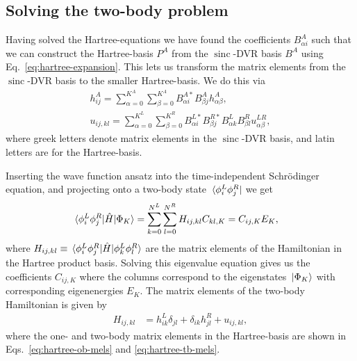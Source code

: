 \documentclass[twocolumn,superscriptaddress,unsortedaddress,
 amsmath,amssymb,
 aps,
]{revtex4-2}
\DeclareMathOperator{\sinc}{sinc}
\begin{document}
    \subsection{Solving the two-body problem}
        Having solved the Hartree-equations we have found
        the coefficients $B^A_{\alpha i}$ such that we can
        construct the Hartree-basis $P^A$ from the
        $\sinc$-DVR basis $B^A$ using
        Eq.~\eqref{eq:hartree-expansion}.
        This lets us transform the matrix elements from the
        $\sinc$-DVR basis to the smaller Hartree-basis.
        We do this via
        \begin{gather}
            h^A_{ij}
            = \sum_{\alpha = 0}^{K^A} \sum_{\beta = 0}^{K^A}
            B^{A*}_{\alpha i} B^A_{\beta j} h^A_{\alpha \beta},
            \label{eq:hartree-ob-mels}
            \\
            u_{ij, kl}
            = \sum_{\alpha = 0}^{K^L} \sum_{\beta = 0}^{K^R}
            B^{L*}_{\alpha i}
            B^{R*}_{\beta j}
            B^{L}_{\alpha k}
            B^{R}_{\beta l}
            u^{LR}_{\alpha \beta},
            \label{eq:hartree-tb-mels}
        \end{gather}
        where greek letters denote matrix elements in the
        $\sinc$-DVR basis, and latin letters are for the
        Hartree-basis.

        Inserting the wave function ansatz into the time-independent Schrödinger
        equation, and projecting onto a two-body state
        $\bra*{\phi^L_i \phi^R_j}$ we get
        \begin{align*}
            \mel*{\phi^L_i \phi^R_j}{\hat{H}}{\Phi_K}
            &= %
            \sum_{k = 0}^{N^L} \sum_{l = 0}^{N^R}
            H_{ij, kl} C_{kl, K}
            = C_{ij, K} E_{K},
        \end{align*}
        where $H_{ij, kl} \equiv \mel*{\phi^L_i \phi^R_j}{\hat{H}}{
        \phi^L_k \phi^R_l}$ are the matrix elements of the Hamiltonian in
        the Hartree product basis.
        Solving this eigenvalue equation gives us the
        coefficients $C_{ij, K}$ where the columns correspond to the
        eigenstates $\ket*{\Phi_K}$ with corresponding eigenenergies $E_K$.
        The matrix elements of the two-body Hamiltonian is given by
        \begin{align*}
            H_{ij,kl}
            &= h^L_{ik} \delta_{jl}
            + \delta_{ik} h^R_{jl}
            + u_{ij, kl},
        \end{align*}
        where the one- and two-body matrix elements in the
        Hartree-basis are shown in
        Eqs.~\eqref{eq:hartree-ob-mels} and
        \eqref{eq:hartree-tb-mels}.
\end{document}
